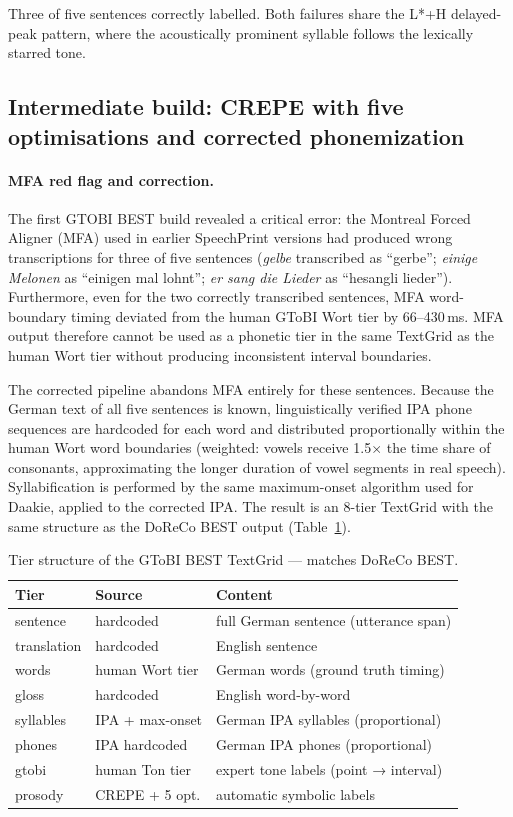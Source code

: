 Three of five sentences correctly labelled. Both failures share the L*+H
delayed-peak pattern, where the acoustically prominent syllable follows the
lexically starred tone.

\subsection{Intermediate build: CREPE with five optimisations and corrected phonemization}

\paragraph{MFA red flag and correction.}
The first GTOBI BEST build revealed a critical error: the Montreal Forced Aligner
(MFA) used in earlier SpeechPrint versions had produced wrong transcriptions for
three of five sentences (\textit{gelbe} transcribed as ``gerbe''; \textit{einige
Melonen} as ``einigen mal lohnt''; \textit{er sang die Lieder} as ``hesangli
lieder''). Furthermore, even for the two correctly transcribed sentences, MFA
word-boundary timing deviated from the human GToBI Wort tier by 66--430\,ms.
MFA output therefore cannot be used as a phonetic tier in the same TextGrid as
the human Wort tier without producing inconsistent interval boundaries.

The corrected pipeline abandons MFA entirely for these sentences. Because the
German text of all five sentences is known, linguistically verified IPA phone
sequences are hardcoded for each word and distributed proportionally within the
human Wort word boundaries (weighted: vowels receive 1.5$\times$ the time share
of consonants, approximating the longer duration of vowel segments in real
speech). Syllabification is performed by the same maximum-onset algorithm used
for Daakie, applied to the corrected IPA. The result is an 8-tier TextGrid with
the same structure as the DoReCo BEST output (Table~\ref{tab:gtobi_tiers}).

\begin{table}[h]
\centering
\caption{Tier structure of the GToBI BEST TextGrid — matches DoReCo BEST.}
\label{tab:gtobi_tiers}
\small
\begin{tabular}{lll}
\hline
Tier & Source & Content \\
\hline
sentence    & hardcoded & full German sentence (utterance span) \\
translation & hardcoded & English sentence \\
words       & human Wort tier & German words (ground truth timing) \\
gloss       & hardcoded & English word-by-word \\
syllables   & IPA + max-onset & German IPA syllables (proportional) \\
phones      & IPA hardcoded & German IPA phones (proportional) \\
gtobi       & human Ton tier & expert tone labels (point → interval) \\
prosody     & CREPE + 5 opt. & automatic symbolic labels \\
\hline
\end{tabular}
\end{table}

